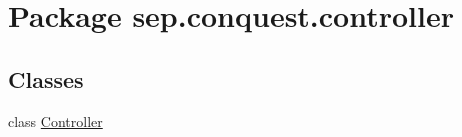 \hypertarget{namespacesep_1_1conquest_1_1controller}{
\section{Package sep.conquest.controller}
\label{namespacesep_1_1conquest_1_1controller}
}
\subsection*{Classes}
\begin{DoxyCompactItemize}
\item 
class \hyperlink{classsep_1_1conquest_1_1controller_1_1_controller}{Controller}
\end{DoxyCompactItemize}
